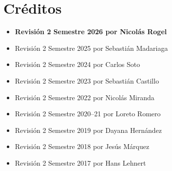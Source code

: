 \documentclass[letterpaper,12pt]{article}
\begin{document}
\section{Créditos}

\begin{itemize}[leftmargin=1.2cm]
    \item \textbf{Revisión 2\textordmasculine{} Semestre 2026 por Nicolás Rogel}
    \item Revisión 2\textordmasculine{} Semestre 2025 por Sebastián Madariaga
    \item Revisión 2\textordmasculine{} Semestre 2024 por Carlos Soto
    \item Revisión 2\textordmasculine{} Semestre 2023 por Sebastián Castillo
    \item Revisión 2\textordmasculine{} Semestre 2022 por Nicolás Miranda
    \item Revisión 2\textordmasculine{} Semestre 2020--21 por Loreto Romero
    \item Revisión 2\textordmasculine{} Semestre 2019 por Dayana Hernández
    \item Revisión 2\textordmasculine{} Semestre 2018 por Jesús Márquez
    \item Revisión 2\textordmasculine{} Semestre 2017 por Hans Lehnert
\end{itemize}
\end{document}

